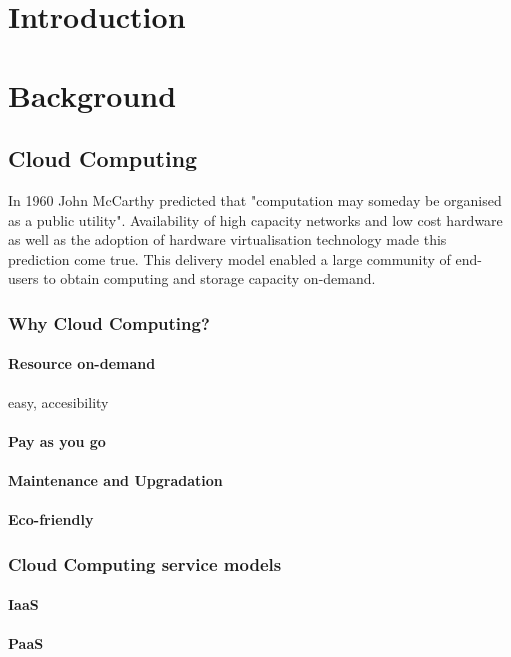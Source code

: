 \documentclass[12pt,a4paper]{report}
\begin{document}



\chapter{Introduction}


\chapter{Background}

\section{Cloud Computing}
In 1960 John McCarthy predicted that "computation may someday be organised as a public utility". Availability of high  capacity networks and low cost hardware as well as the adoption of hardware virtualisation technology made this prediction come true. This delivery model enabled a large community of end-users to obtain computing and storage capacity on-demand. 

\subsection{Why Cloud Computing?}
\subsubsection{Resource on-demand}
easy, accesibility
\subsubsection{Pay as you go}
\subsubsection{Maintenance and Upgradation}
\subsubsection{Eco-friendly}

\subsection{Cloud Computing service models}
\subsubsection{IaaS}
\subsubsection{PaaS}
\end{document}
